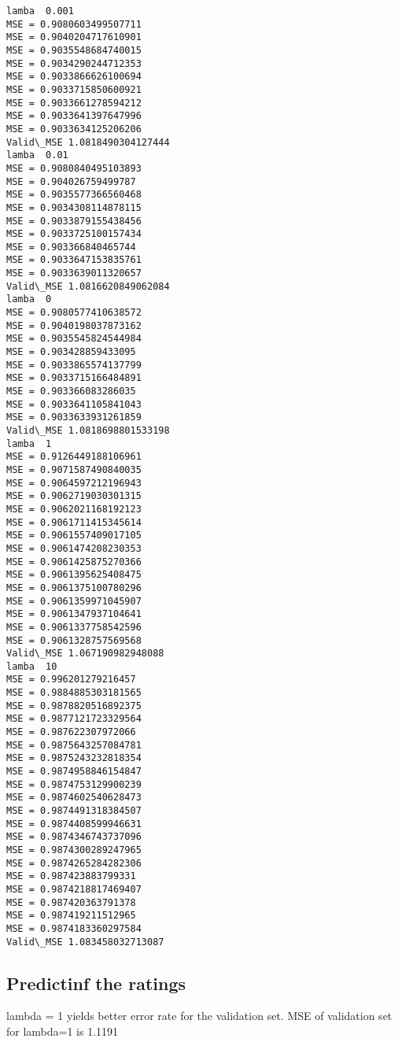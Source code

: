 \documentclass[11pt]{article}
\begin{document}
    \begin{Verbatim}[commandchars=\\\{\}]
lamba  0.001
MSE = 0.9080603499507711
MSE = 0.9040204717610901
MSE = 0.9035548684740015
MSE = 0.9034290244712353
MSE = 0.9033866626100694
MSE = 0.9033715850600921
MSE = 0.9033661278594212
MSE = 0.9033641397647996
MSE = 0.9033634125206206
Valid\_MSE 1.0818490304127444
lamba  0.01
MSE = 0.9080840495103893
MSE = 0.904026759499787
MSE = 0.9035577366560468
MSE = 0.9034308114878115
MSE = 0.9033879155438456
MSE = 0.9033725100157434
MSE = 0.903366840465744
MSE = 0.9033647153835761
MSE = 0.9033639011320657
Valid\_MSE 1.0816620849062084
lamba  0
MSE = 0.9080577410638572
MSE = 0.9040198037873162
MSE = 0.9035545824544984
MSE = 0.903428859433095
MSE = 0.9033865574137799
MSE = 0.9033715166484891
MSE = 0.903366083286035
MSE = 0.9033641105841043
MSE = 0.9033633931261859
Valid\_MSE 1.0818698801533198
lamba  1
MSE = 0.9126449188106961
MSE = 0.9071587490840035
MSE = 0.9064597212196943
MSE = 0.9062719030301315
MSE = 0.9062021168192123
MSE = 0.9061711415345614
MSE = 0.9061557409017105
MSE = 0.9061474208230353
MSE = 0.9061425875270366
MSE = 0.9061395625408475
MSE = 0.9061375100780296
MSE = 0.9061359971045907
MSE = 0.9061347937104641
MSE = 0.9061337758542596
MSE = 0.9061328757569568
Valid\_MSE 1.067190982948088
lamba  10
MSE = 0.996201279216457
MSE = 0.9884885303181565
MSE = 0.9878820516892375
MSE = 0.9877121723329564
MSE = 0.987622307972066
MSE = 0.9875643257084781
MSE = 0.9875243232818354
MSE = 0.9874958846154847
MSE = 0.9874753129900239
MSE = 0.9874602540628473
MSE = 0.9874491318384507
MSE = 0.9874408599946631
MSE = 0.9874346743737096
MSE = 0.9874300289247965
MSE = 0.9874265284282306
MSE = 0.987423883799331
MSE = 0.9874218817469407
MSE = 0.987420363791378
MSE = 0.987419211512965
MSE = 0.9874183360297584
Valid\_MSE 1.083458032713087
    \end{Verbatim}

    \hypertarget{predictinf-the-ratings}{%
\subsection{Predictinf the ratings}\label{predictinf-the-ratings}}

lambda = 1 yields better error rate for the validation set. MSE of
validation set for lambda=1 is 1.1191
\end{document}
